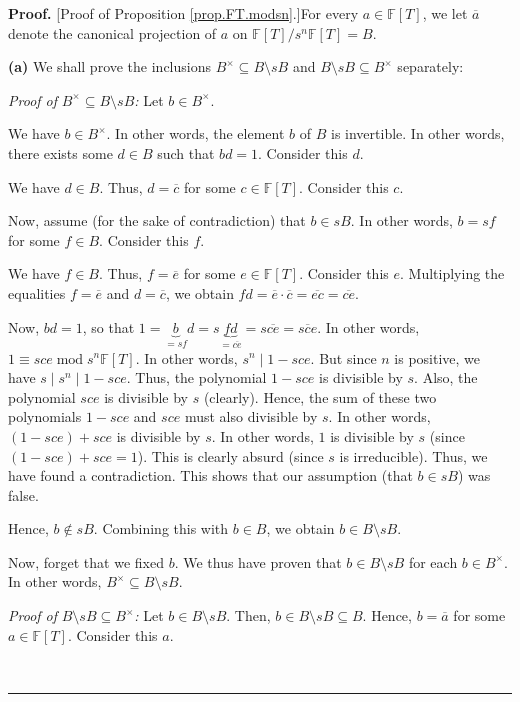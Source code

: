 \documentclass[numbers=enddot,12pt,final,onecolumn,notitlepage]{scrartcl}%
\theoremstyle{definition}
\newenvironment{proof}[1][Proof]{\noindent\textbf{#1.} }{\ \rule{0.5em}{0.5em}}
\begin{document}
\begin{proof}
[Proof of Proposition \ref{prop.FT.modsn}.]For every $a\in\mathbb{F}\left[
T\right]  $, we let $\overline{a}$ denote the canonical projection of $a$ on
$\mathbb{F}\left[  T\right]  /s^{n}\mathbb{F}\left[  T\right]  =B$. \medskip

\textbf{(a)} We shall prove the inclusions $B^{\times}\subseteq B\setminus sB$
and $B\setminus sB\subseteq B^{\times}$ separately:

\textit{Proof of }$B^{\times}\subseteq B\setminus sB$\textit{:} Let $b\in
B^{\times}$.

We have $b\in B^{\times}$. In other words, the element $b$ of $B$ is
invertible. In other words, there exists some $d\in B$ such that $bd=1$.
Consider this $d$.

We have $d\in B$. Thus, $d=\overline{c}$ for some $c\in\mathbb{F}\left[
T\right]  $. Consider this $c$.

Now, assume (for the sake of contradiction) that $b\in sB$. In other words,
$b=sf$ for some $f\in B$. Consider this $f$.

We have $f\in B$. Thus, $f=\overline{e}$ for some $e\in\mathbb{F}\left[
T\right]  $. Consider this $e$. Multiplying the equalities $f=\overline{e}$
and $d=\overline{c}$, we obtain $fd=\overline{e}\cdot\overline{c}%
=\overline{ec}=\overline{ce}$.

Now, $bd=1$, so that $1=\underbrace{b}_{=sf}d=s\underbrace{fd}_{=\overline
{ce}}=s\overline{ce}=\overline{sce}$. In other words, $1\equiv
sce\operatorname{mod}s^{n}\mathbb{F}\left[  T\right]  $. In other words,
$s^{n}\mid1-sce$. But since $n$ is positive, we have $s\mid s^{n}\mid1-sce$.
Thus, the polynomial $1-sce$ is divisible by $s$. Also, the polynomial $sce$
is divisible by $s$ (clearly). Hence, the sum of these two polynomials $1-sce$
and $sce$ must also divisible by $s$. In other words, $\left(  1-sce\right)
+sce$ is divisible by $s$. In other words, $1$ is divisible by $s$ (since
$\left(  1-sce\right)  +sce=1$). This is clearly absurd (since $s$ is
irreducible). Thus, we have found a contradiction. This shows that our
assumption (that $b\in sB$) was false.

Hence, $b\notin sB$. Combining this with $b\in B$, we obtain $b\in B\setminus
sB$.

Now, forget that we fixed $b$. We thus have proven that $b\in B\setminus sB$
for each $b\in B^{\times}$. In other words, $B^{\times}\subseteq B\setminus
sB$.

\textit{Proof of }$B\setminus sB\subseteq B^{\times}$\textit{:} Let $b\in
B\setminus sB$. Then, $b\in B\setminus sB\subseteq B$. Hence, $b=\overline{a}$
for some $a\in\mathbb{F}\left[  T\right]  $. Consider this $a$.


\end{proof}
\end{document}
